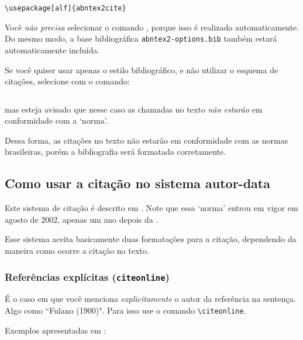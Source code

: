 \documentclass[a4paper]{ltxdoc}
\begin{document}
\begin{verbatim}
\usepackage[alf]{abntex2cite}
\end{verbatim}

\DescribeMacro{}
Você \emph{não precisa} selecionar o comando \verb++, porque
isso é realizado automaticamente. Do mesmo modo, a base bibliográfica
\verb+abntex2-options.bib+ também estará automaticamente incluída.

Se você quiser usar apenas o estilo bibliográfico, e não utilizar o esquema de
citações, selecione com o comando:

\begin{verbatim}

\end{verbatim}

mas esteja avisado que nesse caso as chamadas no texto \emph{não estarão}
em conformidade com a `norma'.

Dessa forma, as citações no texto não estarão em conformidade com as normas
brasileiras, porém a bibliografia será formatada corretamente.

\subsection{Como usar a citação no sistema autor-data}

Este sistema de citação é descrito em . Note que
essa `norma' entrou em vigor em agosto de 2002, apenas um ano depois da
.

Esse sistema aceita basicamente duas formatações para a citação, dependendo da
maneira como ocorre a citação no texto.

\subsubsection{Referências explícitas ({\tt citeonline}) }

\DescribeMacro{\citeonline}
É o caso em que você menciona \emph{explicitamente} o autor da referência na sentença. Algo
como ``Fulano (1900)". Para isso use o comando \verb+\citeonline+.

Exemplos apresentadas em :

\end{document}
